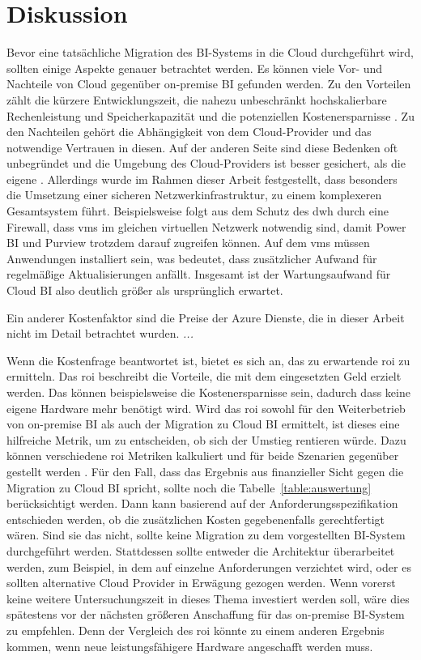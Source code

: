 \chapter{Diskussion} \label{ch:diskussion}
Bevor eine tatsächliche Migration des BI-Systems in die Cloud durchgeführt wird, sollten einige Aspekte genauer betrachtet werden. Es können viele Vor- und Nachteile von Cloud gegenüber on-premise BI gefunden werden. Zu den Vorteilen zählt die kürzere Entwicklungszeit, die nahezu unbeschränkt hochskalierbare Rechenleistung und Speicherkapazität und die potenziellen Kostenersparnisse \cite{ouf_cloud_2011}. Zu den Nachteilen gehört die Abhängigkeit von dem Cloud-Provider und das notwendige Vertrauen in diesen. Auf der anderen Seite sind diese Bedenken oft unbegründet und die Umgebung des Cloud-Providers ist besser gesichert, als die eigene \cite{menon_business_2012}. Allerdings wurde im Rahmen dieser Arbeit festgestellt, dass besonders die Umsetzung einer sicheren Netzwerkinfrastruktur, zu einem komplexeren Gesamtsystem führt. Beispielsweise folgt aus dem Schutz des \ac{dwh} durch eine Firewall, dass \acp{vm} im gleichen virtuellen Netzwerk notwendig sind, damit Power BI und Purview trotzdem darauf zugreifen können. Auf dem \acp{vm} müssen Anwendungen installiert sein, was bedeutet, dass zusätzlicher Aufwand für regelmäßige Aktualisierungen anfällt. Insgesamt ist der Wartungsaufwand für Cloud BI also deutlich größer als ursprünglich erwartet.

Ein anderer Kostenfaktor sind die Preise der Azure Dienste, die in dieser Arbeit nicht im Detail betrachtet wurden. \textit{...}

Wenn die Kostenfrage beantwortet ist, bietet es sich an, das zu erwartende \ac{roi} zu ermitteln. Das \ac{roi} beschreibt die Vorteile, die mit dem eingesetzten Geld erzielt werden. Das können beispielsweise die Kostenersparnisse sein, dadurch dass keine eigene Hardware mehr benötigt wird. Wird das \ac{roi} sowohl für den Weiterbetrieb von on-premise BI als auch der Migration zu Cloud BI ermittelt, ist dieses eine hilfreiche Metrik, um zu entscheiden, ob sich der Umstieg rentieren würde. Dazu können verschiedene \ac{roi} Metriken kalkuliert und für beide Szenarien gegenüber gestellt werden \cite{menon_business_2012}. Für den Fall, dass das Ergebnis aus finanzieller Sicht gegen die Migration zu Cloud BI spricht, sollte noch die Tabelle~\ref{table:auswertung} berücksichtigt werden. Dann kann basierend auf der Anforderungsspezifikation entschieden werden, ob die zusätzlichen Kosten gegebenenfalls gerechtfertigt wären. Sind sie das nicht, sollte keine Migration zu dem vorgestellten BI-System durchgeführt werden. Stattdessen sollte entweder die Architektur überarbeitet werden, zum Beispiel, in dem auf einzelne Anforderungen verzichtet wird, oder es sollten alternative Cloud Provider in Erwägung gezogen werden. Wenn vorerst keine weitere Untersuchungszeit in dieses Thema investiert werden soll, wäre dies spätestens vor der nächsten größeren Anschaffung für das on-premise BI-System zu empfehlen. Denn der Vergleich des \ac{roi} könnte zu einem anderen Ergebnis kommen, wenn neue leistungsfähigere Hardware angeschafft werden muss.

